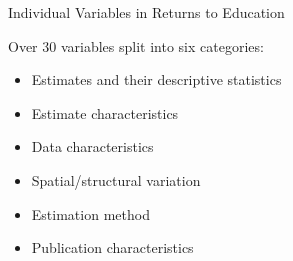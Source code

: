 \documentclass{beamer} %
\begin{document}




\begin{frame}{Individual Variables in Returns to Education}

    Over 30 variables split into six categories:
    \vspace{0.3cm}

    \begin{itemize}
        \item<1-> Estimates and their descriptive statistics
        \item<2-> Estimate characteristics
        \item<3-> Data characteristics
        \item<4-> Spatial/structural variation
        \item<5-> Estimation method
        \item<6-> Publication characteristics
    \end{itemize}

\end{frame}
\end{document}
